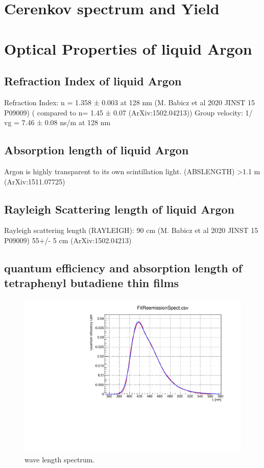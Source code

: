 \documentclass[a4paper]{jpconf}
\begin{document}
\section{Cerenkov spectrum and Yield}
\section{Optical Properties of liquid Argon}
\subsection{Refraction Index of liquid Argon}
Refraction Index: n = 1.358 ± 0.003 at 128 nm (M. Babicz et al 2020 JINST 15 P09009)
                            ( compared to n= 1.45 ± 0.07 (ArXiv:1502.04213))
Group velocity: 1/ vg = 7.46 ± 0.08 ns/m at 128 nm

\subsection{Absorption length of liquid Argon}
Argon is highly transparent to its own scintillation light. (ABSLENGTH)
  >1.1 m (ArXiv:1511.07725) 
  \subsection{Rayleigh Scattering length of liquid Argon}
  Rayleigh scattering length (RAYLEIGH): 90 cm (M. Babicz et al 2020 JINST 15 P09009)
                                                                55+/- 5 cm (ArXiv:1502.04213)
\subsection{ quantum efficiency and absorption length of tetraphenyl butadiene thin films}
\cite{ref:wls}

\begin{figure}[ht]
\begin{center}
\includegraphics[width=35.5pc]{wls.pdf}
\end{center}
\caption{\label{fig1}wave length spectrum.}
\end{figure}
\end{document}
